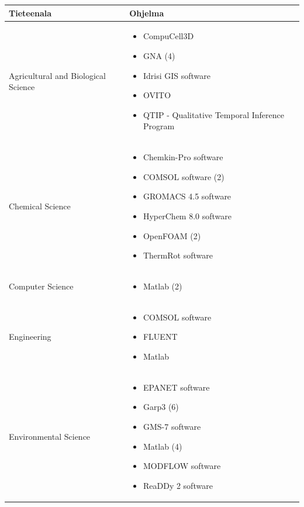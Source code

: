 \documentclass[utf8]{gradu3}
\begin{document}
\begin{longtable}[h]{|p{5cm}|p{8cm}|}
    \hline
    \textbf{Tieteenala}    &    \textbf{Ohjelma}\\
    \hline
    Agricultural and Biological Science & \begin{itemize}
        \item CompuCell3D
        \item GNA (4)
        \item Idrisi GIS software
        \item OVITO
        \item QTIP - Qualitative Temporal Inference Program
    \end{itemize} \\
    \hline
    Chemical Science & \begin{itemize}
        \item Chemkin-Pro software
        \item COMSOL software (2)
        \item GROMACS 4.5 software
        \item HyperChem 8.0 software
        \item OpenFOAM (2)
        \item ThermRot software
    \end{itemize} \\
    \hline
    Computer Science & \begin{itemize}
        \item Matlab (2)
    \end{itemize} \\
    \hline
    Engineering & \begin{itemize}
        \item COMSOL software 
        \item FLUENT
        \item Matlab
    \end{itemize} \\
    \hline
    Environmental Science & \begin{itemize}
        \item EPANET software
        \item Garp3 (6)
        \item GMS-7 software
        \item Matlab (4)
        \item MODFLOW software
        \item ReaDDy 2 software
    \end{itemize} \\

\end{longtable}
\end{document}
